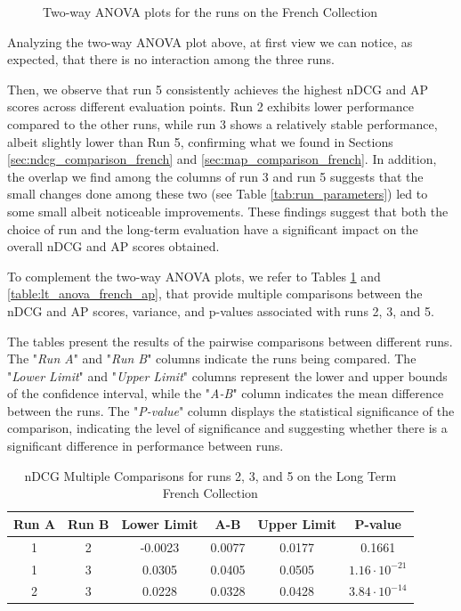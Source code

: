 \begin{figure}[!h]
\begin{subfigure}[b]{0.49\textwidth}
      \label{fig:lt_anova_french_ap}
    \end{subfigure}
    \caption{Two-way \ac{ANOVA} plots for the runs on the French Collection}
    \label{fig:lt_anova_french}
  \end{figure}

Analyzing the two-way \ac{ANOVA} plot above, at first view we can notice, as expected, that there is no interaction among the three runs.  

Then, we observe that run 5 consistently achieves the highest \ac{nDCG}  and \ac{AP} scores across different evaluation points. 
Run 2 exhibits lower performance compared to the other runs, while run 3 shows a relatively stable performance, albeit slightly lower than Run 5, confirming what we found in Sections \ref{sec:ndcg_comparison_french} and \ref{sec:map_comparison_french}.
In addition, the overlap we find among the columns of run 3 and run 5 suggests that the small changes done among these two (see Table \ref{tab:run_parameters}) led to some small albeit noticeable improvements. 
These findings suggest that both the choice of run and the long-term evaluation have a significant impact on the overall \ac{nDCG} and \ac{AP} scores obtained.

To complement the two-way \ac{ANOVA} plots, we refer to Tables \ref{table:lt_anova_french} and \ref{table:lt_anova_french_ap}, that provide multiple comparisons between the \ac{nDCG} and \ac{AP} scores, variance, and p-values associated with runs 2, 3, and 5. 

The tables present the results of the pairwise comparisons between different runs. 
The "\textit{Run A}" and "\textit{Run B}" columns indicate the runs being compared.
The "\textit{Lower Limit}" and "\textit{Upper Limit}" columns represent the lower and upper bounds of the confidence interval, while the "\textit{A-B}" column indicates the mean difference between the runs.
The "\textit{P-value}" column displays the statistical significance of the comparison, indicating the level of significance and suggesting whether there is a significant difference in performance between runs.

\newpage
\begin{table}[!h]
    \centering
    \caption{\ac{nDCG} Multiple Comparisons for runs 2, 3, and 5 on the Long Term French Collection}
    \label{table:lt_anova_french}
    \begin{tabular}{cccccc}
    \hline
    Run A & Run B & Lower Limit & A-B & Upper Limit & P-value \\ \hline
    1 & 2 & -0.0023 & 0.0077 & 0.0177 & 0.1661 \\
    1 & 3 & 0.0305 & 0.0405 & 0.0505 & $1.16 \cdot 10^{-21}$ \\
    2 & 3 & 0.0228 & 0.0328 & 0.0428 & $3.84 \cdot 10^{-14}$ \\ \hline
    \end{tabular}
\end{table}

